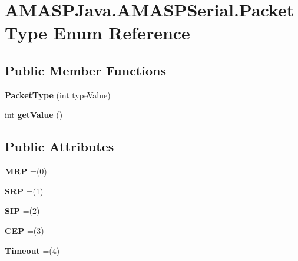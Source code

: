 \hypertarget{enum_a_m_a_s_p_java_1_1_a_m_a_s_p_serial_1_1_packet_type}{}\section{A\+M\+A\+S\+P\+Java.\+A\+M\+A\+S\+P\+Serial.\+Packet\+Type Enum Reference}
\label{enum_a_m_a_s_p_java_1_1_a_m_a_s_p_serial_1_1_packet_type}
\subsection*{Public Member Functions}
\begin{DoxyCompactItemize}
\item 
\mbox{\label{enum_a_m_a_s_p_java_1_1_a_m_a_s_p_serial_1_1_packet_type_a2894f840db3016481f9cca8ac1a55655}} 
{\bfseries Packet\+Type} (int type\+Value)
\item 
\mbox{\label{enum_a_m_a_s_p_java_1_1_a_m_a_s_p_serial_1_1_packet_type_ad2e536a06c3a0ef08f000f82e27bb38c}} 
int {\bfseries get\+Value} ()
\end{DoxyCompactItemize}
\subsection*{Public Attributes}
\begin{DoxyCompactItemize}
\item 
\mbox{\label{enum_a_m_a_s_p_java_1_1_a_m_a_s_p_serial_1_1_packet_type_a1e17504cf3473a5958e924e0da82621f}} 
{\bfseries M\+RP} =(0)
\item 
\mbox{\label{enum_a_m_a_s_p_java_1_1_a_m_a_s_p_serial_1_1_packet_type_a331052aeb7ccc2daf5a2109078ba4156}} 
{\bfseries S\+RP} =(1)
\item 
\mbox{\label{enum_a_m_a_s_p_java_1_1_a_m_a_s_p_serial_1_1_packet_type_a1d9e14914943fc539974d6c2eb3eb8c7}} 
{\bfseries S\+IP} =(2)
\item 
\mbox{\label{enum_a_m_a_s_p_java_1_1_a_m_a_s_p_serial_1_1_packet_type_aff9d32baf5306e44de736e24adf9e546}} 
{\bfseries C\+EP} =(3)
\item 
\mbox{\label{enum_a_m_a_s_p_java_1_1_a_m_a_s_p_serial_1_1_packet_type_a3690fccfbd773fedf052143119c6d064}} 
{\bfseries Timeout} =(4)
\end{DoxyCompactItemize}


